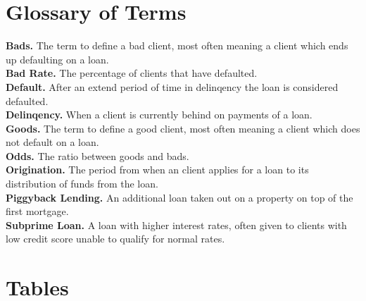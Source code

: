 \begin{appendices}
\chapter{Glossary of Terms}\label{sec:glossary}

\textbf{Bads.} The term to define a bad client, most often meaning a client which ends up defaulting on a loan.\\

\noindent \textbf{Bad Rate.} The percentage of clients that have defaulted.\\

\noindent \textbf{Default.} After an extend period of time in delinqency the loan is considered defaulted.\\

\noindent \textbf{Delinqency.} When a client is currently behind on payments of a loan.\\

\noindent \textbf{Goods.} The term to define a good client, most often meaning a client which does not default on a loan.\\

\noindent \textbf{Odds.} The ratio between goods and bads.\\

\noindent \textbf{Origination.} The period from when an client applies for a loan to its distribution of funds from the loan.\\

\noindent \textbf{Piggyback Lending.} An additional loan taken out on a property on top of the first mortgage.\\

\noindent \textbf{Subprime Loan.} A loan with higher interest rates, often given to clients with low credit score unable to qualify for normal rates. \\


\chapter{Tables}


\end{appendices}

